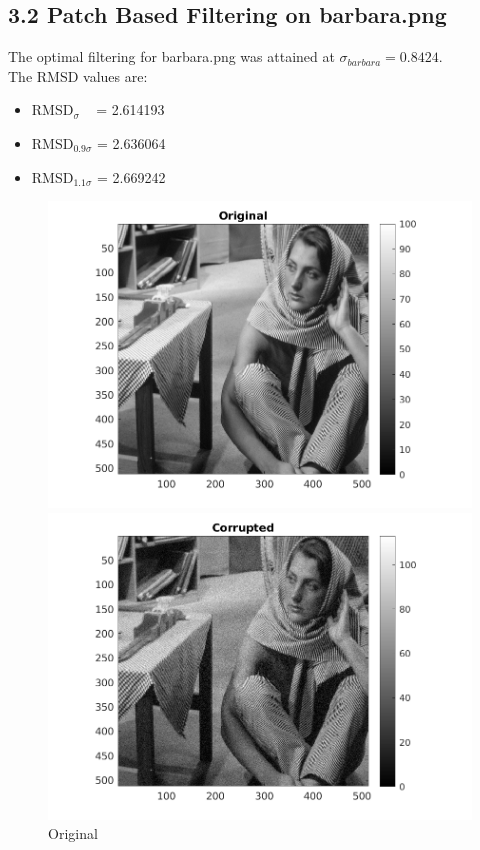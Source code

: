 \documentclass[12pt, a4paper]{article}
\begin{document}
\subsection*{3.2 Patch Based Filtering on barbara.png}
\noindent The optimal filtering for barbara.png was attained at $\sigma_{barbara} = 0.8424$. \\
The RMSD values are:
\begin{itemize}
	\item RMSD$_{\sigma}\;\;\;$  = 2.614193
	\item RMSD$_{0.9\sigma}$ = 2.636064
	\item RMSD$_{1.1\sigma}$ = 2.669242
\end{itemize}
\begin{figure}[h]
    \centering
    \renewcommand{\thefigure}{3.2(a)}
    \begin{minipage}[c][1\width]{0.3\textwidth}
    	\hspace*{-1in}
    	\includegraphics[width=1.5\textwidth]{barbara_original.png}
    	\caption{Original}
	    \label{fig:3.2(a)}
    \end{minipage}
    \renewcommand{\thefigure}{3.2(b)}
    \begin{minipage}[c][1\width]{0.3\textwidth}
    	\hspace*{-0.5in}
    	\includegraphics[width=1.5\textwidth]{barbara_corrupted.png}

\end{minipage}
\end{figure}
\end{document}
